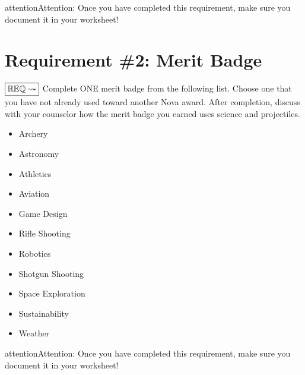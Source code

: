 \documentclass[letterpaper,10pt,english,openany,oneside]{sphinxmanual}
\let\sphinxpxdimen\pdfpxdimen\else\newdimen\sphinxpxdimen
\begin{document}
\begin{sphinxadmonition}{attention}{Attention:}
Once you have completed this requirement, make sure you document it in your worksheet!
\end{sphinxadmonition}


\chapter{Requirement \#2: Merit Badge}
\label{\detokenize{requirement2:requirement-2-merit-badge}}\label{\detokenize{requirement2::doc}}
\(\boxed{\mathbb{REQ}\Large \rightsquigarrow}\) Complete ONE merit badge from the following list. Choose one that you have not already used toward another Nova award.
After completion, discuss with your counselor how the merit badge you earned uses science and projectiles.
\begin{itemize}
\item {} 
Archery

\item {} 
Astronomy

\item {} 
Athletics

\item {} 
Aviation

\item {} 
Game Design

\item {} 
Rifle Shooting

\item {} 
Robotics

\item {} 
Shotgun Shooting

\item {} 
Space Exploration

\item {} 
Sustainability

\item {} 
Weather

\end{itemize}

\begin{figure}[htbp]
\centering

\noindent\sphinxincludegraphics[width=700\sphinxpxdimen]{{meritbadges}.png}
\end{figure}

\begin{sphinxadmonition}{attention}{Attention:}
Once you have completed this requirement, make sure you document it in your worksheet!
\end{sphinxadmonition}
\end{document}
